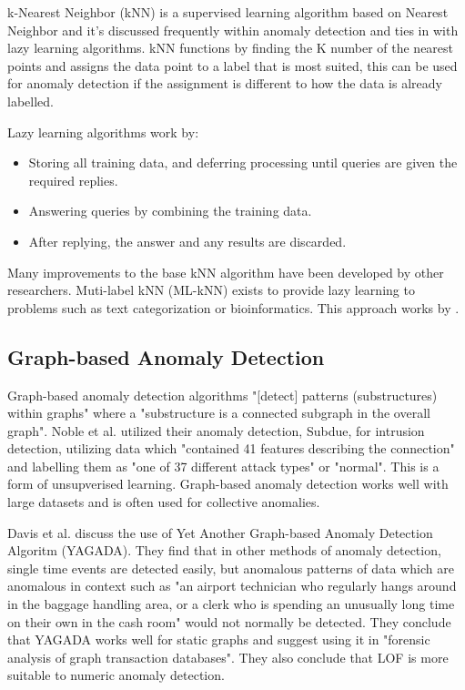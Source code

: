 \documentclass[journal]{IEEEtran}
\begin{document}
k-Nearest Neighbor (kNN) is a supervised learning algorithm based on Nearest Neighbor and it's discussed frequently within anomaly detection and ties in with lazy learning algorithms. kNN functions by finding the K number of the nearest points and assigns the data point to a label that is most suited, this can be used for anomaly detection if the assignment is different to how the data is already labelled\cite{Cover1967}.

Lazy learning algorithms work by\cite{Wettschereck1997}:
\begin{itemize}
    \item Storing all training data, and deferring processing until queries are given the required replies.
    \item Answering queries by combining the training data.
    \item After replying, the answer and any results are discarded.
\end{itemize}

Many improvements to the base kNN algorithm have been developed by other researchers. Muti-label kNN (ML-kNN) exists to provide lazy learning to problems such as text categorization or bioinformatics. This approach works by \cite{Zhang2005}.

\subsection{Graph-based Anomaly Detection}
\noindent Graph-based anomaly detection algorithms "[detect] patterns (substructures) within graphs" where a "substructure is a connected subgraph in the overall graph"\cite{Noble2003}. Noble et al. utilized their anomaly detection, Subdue, for intrusion detection, utilizing data which "contained 41 features describing the connection" and labelling them as "one of 37 different attack types" or "normal". This is a form of unsupverised learning\cite{Noble2003}. Graph-based anomaly detection works well with large datasets and is often used for collective anomalies\cite{Egilmez2014}.

Davis et al. discuss the use of Yet Another Graph-based Anomaly Detection Algoritm (YAGADA). They find that in other methods of anomaly detection, single time events are detected easily, but anomalous patterns of data which are anomalous in context such as "an airport technician who regularly hangs around in the baggage handling area, or a clerk who is spending an unusually long time on their own
in the cash room" would not normally be detected. They conclude that YAGADA works well for static graphs and suggest using it in "forensic analysis of graph transaction databases". They also conclude that LOF\cite{Breunig2000} is more suitable to numeric anomaly detection.
\end{document}
